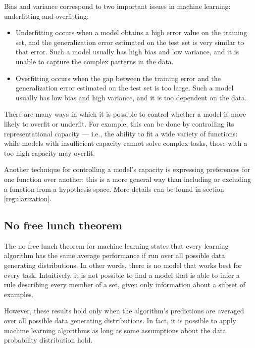             Bias and variance correspond to two important issues in machine learning: underfitting and overfitting:
            \begin{itemize}
                \item Underfitting occurs when a model obtains a high error value on the training set, and the generalization error estimated on the test set is very similar to that error. Such a model usually has high bias and low variance, and it is unable to capture the complex patterns in the data.
                \item Overfitting occurs when the gap between the training error and the generalization error estimated on the test set is too large. Such a model usually has low bias and high variance, and it is too dependent on the data.
            \end{itemize}
            There are many ways in which it is possible to control whether a model is more likely to overfit or underfit. For example, this can be done by controlling its representational capacity \cite[111-113]{Goodfellow} --- i.e., the ability to fit a wide variety of functions: while models with insufficient capacity cannot solve complex tasks, those with a too high capacity may overfit.
            
            Another technique for controlling a model's capacity is expressing preferences for one function over another: this is a more general way than including or excluding a function from a hypothesis space. More details can be found in section \ref{regularization}.
        \subsection{No free lunch theorem}
            The no free lunch theorem for machine learning \cite{Wolpert} states that every learning algorithm has the same average performance if run over all possible data generating distributions. In other words, there is no model that works best for every task. Intuitively, it is not possible to find a model that is able to infer a rule describing every member of a set, given only information about a subset of examples.
            
            However, these results hold only when the algorithm's predictions are averaged over all possible data generating distributions. In fact, it is possible to apply machine learning algorithms as long as some assumptions about the data probability distribution hold. 
            
